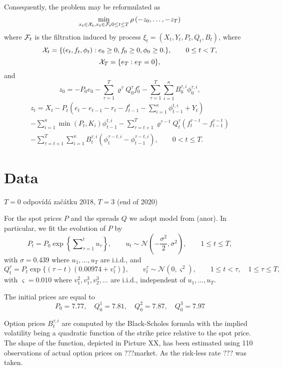 \documentclass[3p,times]{elsarticle}
\begin{document}
Consequently, the problem may be reformulated as
\[
\min_{x_{t}\in\mathcal{X}_{t},x_t \in \mathcal{F}_t 0\leq t\leq T}\rho\left(-z_{0},\dots,-z_{T}\right)
\]
where $\mathcal{F}_t$ is the filtration induced by process
$\xi_{t}=(X_{t},Y_{t},P_{t},Q_{t},B_t)$, where
$$
\mathcal{X}_{t}=\{(e_{t}, f_{t},\phi_{t}): e_0 \geq 0, f_0\geq0,
\phi_{0} \geq0.\},\qquad 0\leq t < T,$$
$$
\mathcal{X}_T = \{e_T:e_T=0\},
$$
and
$$
z_0=-P_0e_0-\sum_{\tau=1}^{T}\varrho^{\tau}Q_0^{\tau} f_0^{\tau}-  \sum_{\tau=1}^{T}\sum_{i=1}^{\kappa}B_0^{\tau,i}\phi_0^{\tau,i}, 
$$
\begin{multline*}
z_t  =X_t-P_t 
\left(
e_t -e_{t-1}-r_t-
f_{t-1}^t-\sum_{i=1}^{\kappa}\phi_{t-1}^{t,i}+Y_t
\right)
\\
-\sum_{i=1}^{\kappa}\min(P_t,K_{i})\phi_{t-1}^{t,i}
-\sum_{\tau=t+1}^{T}\varrho^{\tau-t}Q_t^{\tau}(f_t^{\tau-t}
-f_{t-1}^{\tau-t})
\\-\sum_{\tau=t+1}^{T}\sum_{i=1}^{\kappa}B_t^{\tau,i}
(\phi_t^{\tau-t,i}-\phi_{t-1}^{\tau-t,i}),\qquad 0<t\leq T.
\end{multline*}



\section{Data}

$T=0$ odpovídá začátku 2018, $T=3$ (end of 2020)

For the spot prices $P$ and the spreads $Q$ we adopt model from (anor). In particular, we fit the evolution of $P$ by 
\[
P_{t}=P_{0}\exp\left\{ \sum\nolimits_{\tau=1}^t u_{\tau} \right\},
\qquad u_t \sim \mathcal{N}\left(
-\frac{\sigma^2}{2},\sigma^2
\right),\qquad 1\leq t \leq T, 
\]
with $\sigma=0.439$ where $u_{1},\dots,u_T$ are i.i.d., and
\[
Q^\tau_{t}=P_t\exp\{(\tau-t)(0.00974+v^\tau_{t})\},\qquad v^\tau_{t}\sim \mathcal{N}(0,\varsigma^2),\qquad 1\leq t< \tau,\quad 1\leq \tau \leq T,
	\]
with $\varsigma=0.010$ where $v^2_1,v_1^3,v_2^3,\dots$ are i.i.d., independent of $u_1,\dots,u_T$.

The initial prices are equal to 
$$P_0=7.77, \quad Q^1_0=7.81,\quad Q^2_0=7.87,\quad Q^3_0=7.97$$ %

Option prices $B^{\tau,i}_t$ are computed by the Black-Scholes formula with the implied volatility being a quadratic function of the strike price relative to the spot price. The shape of the function, depicted in Picture XX, has been estimated using 110 observations of actual option prices on ???market. As the risk-less rate ??? was taken. 
\end{document}
